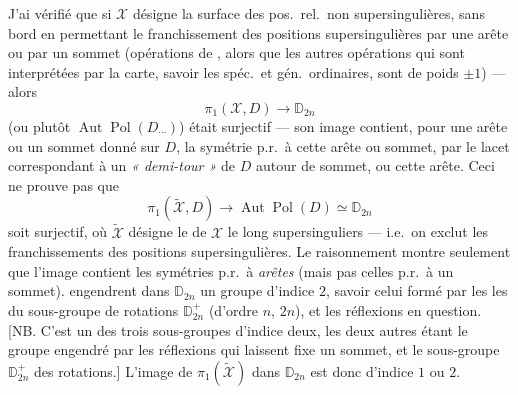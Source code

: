 \documentclass[11pt,a4paper]{article}
\begin{document}
J'ai vérifié que si $\mathcal{X}$ désigne la surface des pos.\ rel.\ non supersingulières, sans bord en permettant le franchissement des positions supersingulières par une arête ou par un sommet (opérations de , alors que les autres opérations qui sont interprétées par la carte, savoir les spéc.\ et gén.\ ordinaires, sont de poids $\pm 1$) --- alors
\[
\pi_1(\mathcal{X}, D) \longrightarrow \mathbb{D}_{2n}
\]
(ou plutôt $\operatorname{Aut}\operatorname{Pol}(D_{\cdots})$)
était surjectif --- son image contient, pour une arête ou un \struck{\ill{}} sommet donné sur $D$, la symétrie p.r.\ à cette arête ou sommet, par le lacet correspondant à un \emph{« demi-tour »} de $D$ autour de  sommet, ou cette arête. Ceci ne prouve pas que
\[
\pi_1(\widetilde{\mathcal{X}}, D) \longrightarrow \operatorname{Aut}\operatorname{Pol}(D) \simeq \mathbb{D}_{2n}
\]
soit surjectif, où $\widetilde{\mathcal{X}}$ désigne le  de $\mathcal{X}$ le long \struck{\ill{}}  supersinguliers --- i.e.\ on exclut les franchissements des positions supersingulières. Le raisonnement montre seulement que l'image contient les symétries p.r.\ à \struck{\ill{}} \emph{arêtes} (mais pas \struck{\ill{}} celles p.r.\ à un sommet). \struck{\ill{} \ill{} \ill{}}  engendrent dans $\mathbb{D}_{2n}$ un groupe d'indice $2$, savoir celui formé par les  les  du sous-groupe de rotations $\mathbb{D}_{2n}^{+}$ (d'ordre $n$,  $2n$), et les réflexions en question. [NB. C'est un des trois sous-groupes d'indice deux, les deux autres étant le groupe engendré \struck{\ill{}} par les réflexions qui laissent fixe \struck{\ill{}} un sommet, et le sous-groupe $\mathbb{D}_{2n}^{+}$ des rotations.] L'image de $\pi_1(\widetilde{\mathcal{X}})$ dans $\mathbb{D}_{2n}$ est donc d'indice $1$ ou $2$.
\end{document}
